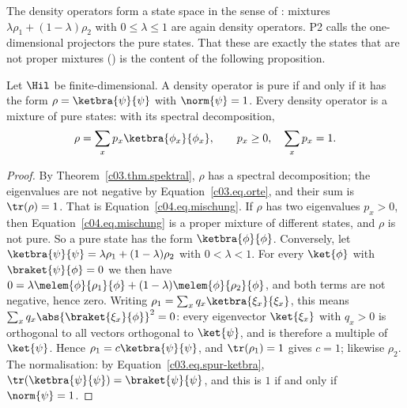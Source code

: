 The density operators form a state space in the sense of : mixtures
$\lambda\rho_1 + (1-\lambda)\rho_2$ with $0 \leq \lambda \leq 1$ are again density operators.
P2 calls the one-dimensional projectors the pure states. That these are exactly the states that
are not proper mixtures () is the content of the following proposition.

\begin{proposition}\label{c04.prop.rein}
  Let $\Hil$ be finite-dimensional. A density operator is pure if and only if it has the form
  $\rho = \ketbra{\psi}{\psi}$ with $\norm{\psi} = 1$. Every density operator is a mixture of pure
  states: with its spectral decomposition,
  \begin{equation}\label{c04.eq.mischung}
    \rho = \sum_x p_x \ketbra{\phi_x}{\phi_x} ,
    \qquad p_x \geq 0 , \quad \sum_x p_x = 1 .
  \end{equation}
\end{proposition}
\begin{proof}
  By Theorem~\ref{c03.thm.spektral}, $\rho$ has a spectral decomposition; the eigenvalues are not
  negative by Equation~\eqref{c03.eq.orte}, and their sum is $\tr(\rho) = 1$. That is
  Equation~\eqref{c04.eq.mischung}. If $\rho$ has two eigenvalues $p_x > 0$, then
  Equation~\eqref{c04.eq.mischung} is a proper mixture of different states, and $\rho$ is not pure.
  So a pure state has the form $\ketbra{\phi}{\phi}$. Conversely, let
  $\ketbra{\psi}{\psi} = \lambda\rho_1 + (1-\lambda)\rho_2$ with $0 < \lambda < 1$. For every
  $\ket{\phi}$ with $\braket{\psi}{\phi} = 0$ we then have
  $0 = \lambda\melem{\phi}{\rho_1}{\phi} + (1-\lambda)\melem{\phi}{\rho_2}{\phi}$, and both terms
  are not negative, hence zero. Writing $\rho_1 = \sum_x q_x \ketbra{\xi_x}{\xi_x}$, this means
  $\sum_x q_x \abs{\braket{\xi_x}{\phi}}^2 = 0$: every eigenvector $\ket{\xi_x}$ with $q_x > 0$
  is orthogonal to all vectors orthogonal to $\ket{\psi}$, and is therefore a multiple of
  $\ket{\psi}$. Hence $\rho_1 = c\ketbra{\psi}{\psi}$, and $\tr(\rho_1) = 1$ gives $c = 1$;
  likewise $\rho_2$. The normalisation: by Equation~\eqref{c03.eq.spur-ketbra},
  $\tr(\ketbra{\psi}{\psi}) = \braket{\psi}{\psi}$, and this is $1$ if and only if
  $\norm{\psi} = 1$.
\end{proof}

